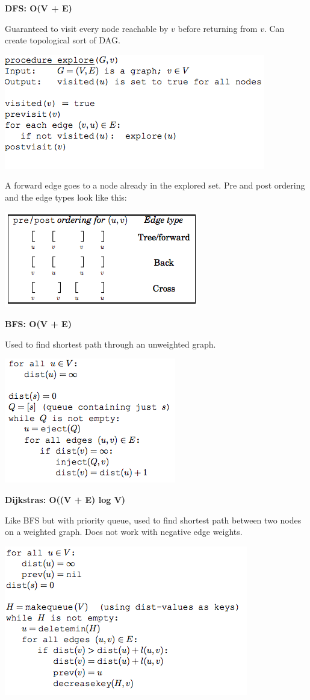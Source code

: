 \documentclass[landscape]{article}
\begin{document}
\begin{multicols}{3}
\textbf{DFS: O(V + E)}

Guaranteed to visit every node reachable by $v$ before returning from $v$.
Can create topological sort of DAG.

\includegraphics[scale=0.5]{DFS}

A forward edge goes to a node already in the explored set. Pre and post ordering and the edge types look like this:

\includegraphics[scale=0.5]{prepost}

\textbf{BFS: O(V + E)}

Used to find shortest path through an unweighted graph.

\includegraphics[scale=0.5]{BFS}

\textbf{Dijkstras: O((V + E) log V)}

Like BFS but with priority queue, used to find shortest path between two nodes on a weighted graph. Does not work with negative edge weights. 

\includegraphics[scale=0.5]{dijkstra}


\end{multicols}
\end{document}
